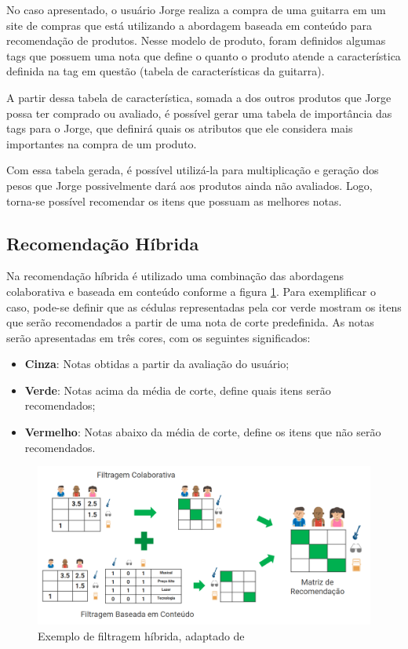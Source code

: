 No caso apresentado, o usuário Jorge realiza a compra de uma guitarra em um site de compras que está utilizando a abordagem baseada em conteúdo para recomendação de produtos. Nesse modelo de produto, foram definidos algumas tags que possuem uma nota que define o quanto o produto atende a característica definida na tag em questão (tabela de características da guitarra).

A partir dessa tabela de característica, somada a dos outros produtos que Jorge possa ter comprado ou avaliado, é possível gerar uma tabela de importância das tags para o Jorge, que definirá quais os atributos que ele considera mais importantes na compra de um produto.

Com essa tabela gerada, é possível utilizá-la para multiplicação e geração dos pesos que Jorge possivelmente dará aos produtos ainda não avaliados. Logo, torna-se possível recomendar os itens que possuam as melhores notas.

\subsection{Recomendação Híbrida}

Na recomendação híbrida é utilizado uma combinação das abordagens colaborativa e baseada em conteúdo conforme a figura \ref{fig:algoritmohibrido}. Para exemplificar o caso, pode-se definir que as cédulas representadas pela cor verde mostram os itens que serão recomendados a partir de uma nota de corte predefinida. As notas serão apresentadas em três cores, com os seguintes significados:

\begin{itemize}
    \item \textbf{Cinza}: Notas obtidas a partir da avaliação do usuário;
    \item \textbf{Verde}: Notas acima da média de corte, define quais itens serão recomendados;
    \item \textbf{Vermelho}: Notas abaixo da média de corte, define os itens que não serão recomendados.
\end{itemize}

\begin{figure}[H]
	\centering
	\includegraphics[width=1\linewidth]{imagens/hibrida.png}
	\caption[Exemplo de filtragem híbrida]{Exemplo de filtragem híbrida, adaptado de \cite{araujo2011apprecommender}}
    \label{fig:algoritmohibrido}
\end{figure}

